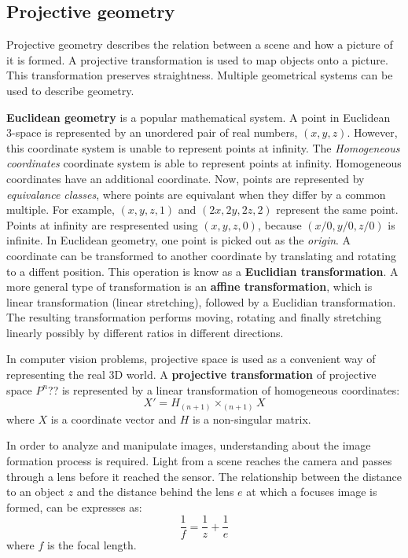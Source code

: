 {\subsection{Projective geometry}
Projective geometry describes the relation between a scene and how a picture of it is formed.
A projective transformation is used to map objects onto a picture.
This transformation preserves straightness.
Multiple geometrical systems can be used to describe geometry.

\textbf{Euclidean geometry} is a popular mathematical system.
A point in Euclidean 3-space is represented by an unordered pair of real numbers, $(x, y, z)$.
However, this coordinate system is unable to represent points at infinity.
The \textit{Homogeneous coordinates} coordinate system is able to represent points at infinity.
Homogeneous coordinates have an additional coordinate.
Now, points are represented by \textit{equivalance classes}, where points are equivalant when they differ by a common multiple.
For example, $(x, y, z, 1)$ and $(2x, 2y, 2z, 2)$ represent the same point.
Points at infinity are respresented using $(x, y, z, 0)$, because $(x/0, y/0, z/0)$ is infinite.
In Euclidean geometry, one point is picked out as the \textit{origin}.
A coordinate can be transformed to another coordinate by translating and rotating to a diffent position.
This operation is know as a \textbf{Euclidian transformation}.
A more general type of transformation is an \textbf{affine transformation}, which is linear transformation (linear stretching), followed by a Euclidian transformation.
The resulting transformation performs moving, rotating and finally stretching linearly possibly by different ratios in different directions.

In computer vision problems, projective space is used as a convenient way of representing the real 3D world.
A \textbf{projective transformation} of projective space $P^n$?? is represented by a linear transformation of homogeneous coordinates:
\begin{equation}
X' = H_(n+1) \times _(n+1)X
\end{equation}
where $X$ is a coordinate vector and $H$ is a non-singular matrix.

In order to analyze and manipulate images, understanding about the image formation process is required.
Light from a scene reaches the camera and passes through a lens before it reached the sensor.
The relationship between the distance to an object $z$ and the distance behind the lens $e$ at which a focuses image is formed, can be expresses as:
\begin{equation}
\label{eq:optics}
\frac{1}{f} = \frac{1}{z} + \frac{1}{e}
\end{equation}
where $f$ is the focal length.

}
